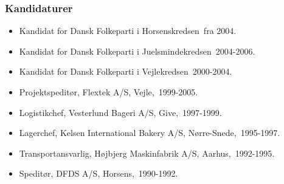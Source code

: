 \documentclass[11pt, a4paper]{awesome-cv}
\begin{document}
\begin{cvletter}
\subsubsection*{Kandidaturer}
\begin{itemize}
\item Kandidat for Dansk Folkeparti i Horsenskredsen fra 2004.
\item Kandidat for Dansk Folkeparti i Juelsmindekredsen 2004-2006.
\item Kandidat for Dansk Folkeparti i Vejlekredsen 2000-2004.
\end{itemize}
\begin{itemize}
\item Projektspeditør, Flextek A/S, Vejle, 1999-2005.
\item Logistikchef, Vesterlund Bageri A/S, Give, 1997-1999.
\item Lagerchef, Kelsen International Bakery A/S, Nørre-Snede, 1995-1997.
\item Transportansvarlig, Højbjerg Maskinfabrik A/S, Aarhus, 1992-1995.
\item Speditør, DFDS A/S, Horsens, 1990-1992.
\end{itemize}
\end{cvletter}
\end{document}
